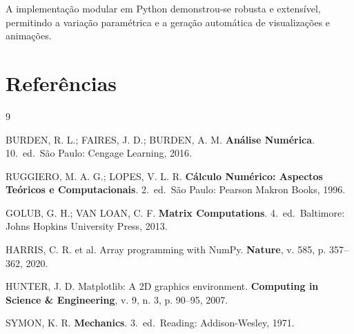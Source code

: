 \documentclass[
  12pt,
  a4paper,
  chapter=TITLE,
  section=TITLE,
  brazil,
  oneside
]{abntex2}
\begin{document}
A implementação modular em Python demonstrou-se robusta e extensível, permitindo a
variação paramétrica e a geração automática de visualizações e animações.

\chapter*{Referências}

\begin{thebibliography}{9}

BURDEN, R. L.; FAIRES, J. D.; BURDEN, A. M.
\textbf{Análise Numérica}.
10.\ ed.\ São Paulo: Cengage Learning, 2016.

RUGGIERO, M. A. G.; LOPES, V. L. R.
\textbf{Cálculo Numérico: Aspectos Teóricos e Computacionais}.
2.\ ed.\ São Paulo: Pearson Makron Books, 1996.

GOLUB, G. H.; VAN LOAN, C. F.
\textbf{Matrix Computations}.
4.\ ed.\ Baltimore: Johns Hopkins University Press, 2013.

HARRIS, C. R. et al.
Array programming with NumPy.
\textbf{Nature}, v. 585, p. 357--362, 2020.

HUNTER, J. D.
Matplotlib: A 2D graphics environment.
\textbf{Computing in Science \& Engineering}, v. 9, n. 3, p. 90--95, 2007.

SYMON, K. R.
\textbf{Mechanics}.
3.\ ed.\ Reading: Addison-Wesley, 1971.

\end{thebibliography}
\end{document}
